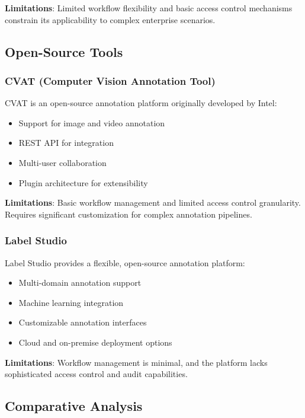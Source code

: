 \textbf{Limitations}: Limited workflow flexibility and basic access control mechanisms constrain its applicability to complex enterprise scenarios.

\subsection{Open-Source Tools}

\subsubsection{CVAT (Computer Vision Annotation Tool)}

CVAT \cite{cvat2023} is an open-source annotation platform originally developed by Intel:

\begin{itemize}
    \item Support for image and video annotation
    \item REST API for integration
    \item Multi-user collaboration
    \item Plugin architecture for extensibility
\end{itemize}

\textbf{Limitations}: Basic workflow management and limited access control granularity. Requires significant customization for complex annotation pipelines.

\subsubsection{Label Studio}

Label Studio \cite{labelstudio2023} provides a flexible, open-source annotation platform:

\begin{itemize}
    \item Multi-domain annotation support
    \item Machine learning integration
    \item Customizable annotation interfaces
    \item Cloud and on-premise deployment options
\end{itemize}

\textbf{Limitations}: Workflow management is minimal, and the platform lacks sophisticated access control and audit capabilities.

\subsection{Comparative Analysis}

